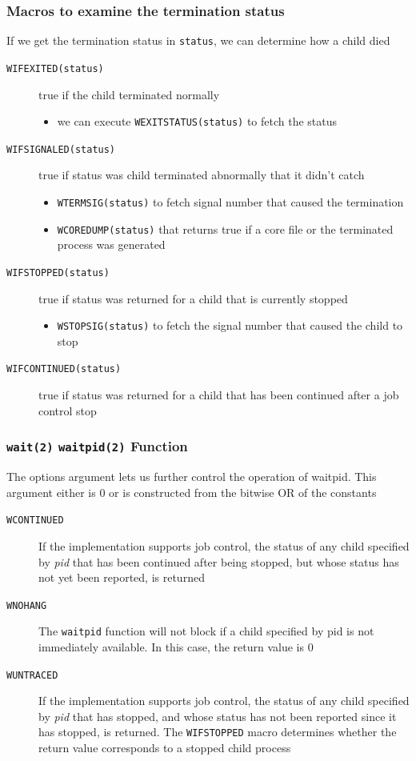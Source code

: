 \documentclass[newPxFont,sthlmFooter,nooffset]{beamer}
\begin{document}
\begin{frame}[t]
  \frametitle{Macros to examine the termination status}
If we get the termination status in \texttt{status}, we can determine how a child died
\begin{description}
\item[\texttt{WIFEXITED(status)}] true if the child terminated normally
  \begin{itemize}
  \item \footnotesize we can execute \texttt{WEXITSTATUS(status)} to fetch the status
  \end{itemize}
\item[\texttt{WIFSIGNALED(status)}] true if status was child terminated abnormally that it didn't catch
  \begin{itemize}
  \item \footnotesize \texttt{WTERMSIG(status)} to fetch signal number that caused the termination
  \item \footnotesize \texttt{WCOREDUMP(status)} that returns true if a core file or the terminated process was generated
  \end{itemize}
\item[\texttt{WIFSTOPPED(status)}] true if status was returned for a child that is currently stopped
  \begin{itemize}
  \item \footnotesize \texttt{WSTOPSIG(status)} to fetch the signal number that caused the child to stop
  \end{itemize}
\item[\texttt{WIFCONTINUED(status)}] true if status was returned for a child that has been continued after a job control stop
\end{description}
\end{frame}

\begin{frame}[containsverbatim,t]
  \frametitle{\texttt{wait(2)} \texttt{waitpid(2)} Function}  
The options argument lets us further control the operation of waitpid. This argument either is 0 or is constructed from the bitwise OR of the constants 
  \begin{description}
  \item[\texttt{WCONTINUED}] If the implementation supports job
    control, the status of any child specified by \textit{pid} that
    has been continued after being stopped, but whose status has not
    yet been reported, is returned
  \item[\texttt{WNOHANG}] The \texttt{waitpid} function will not block
    if a child specified by pid is not immediately available. In this
    case, the return value is 0
  \item[\texttt{WUNTRACED}] If the implementation supports job
    control, the status of any child specified by \textit{pid} that
    has stopped, and whose status has not been reported since it has
    stopped, is returned. The \texttt{WIFSTOPPED} macro determines
    whether the return value corresponds to a stopped child process
  \end{description}
\end{frame}
\end{document}
